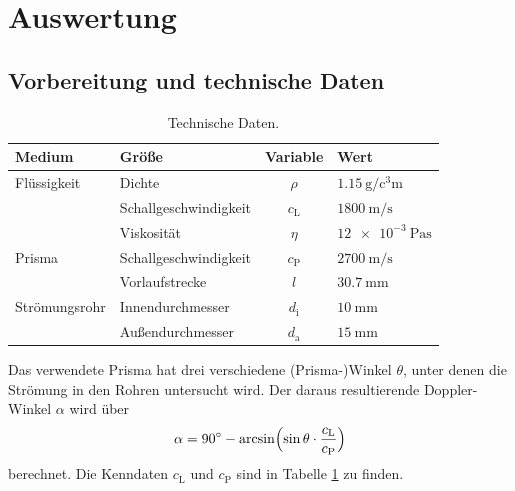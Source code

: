 \section{Auswertung}
\label{sec:Auswertung}

\subsection{Vorbereitung und technische Daten}

\begin{table}
    \centering
    \caption{Technische Daten.}
    \label{tab:techDaten}
    \begin{tabular}{l l c l}
        \toprule
        Medium          & Größe                 & Variable      & Wert                                      \\
        \midrule
        Flüssigkeit     & Dichte                & $\rho$        & $\SI{1.15}{\gram\per\cubic\centi\meter}$  \\
                        & Schallgeschwindigkeit & $c_\text{L}$  & $\SI{1800}{\meter\per\second}$            \\
                        & Viskosität            & $\eta$        & $\SI{12e-3}{\pascal\second}$              \\
        Prisma          & Schallgeschwindigkeit & $c_\text{P}$  & $\SI{2700}{\meter\per\second}$            \\
                        & Vorlaufstrecke        & $l$           & $\SI{30.7}{\milli\meter}$                 \\
        Strömungsrohr   & Innendurchmesser      & $d_\text{i}$  & $\SI{10}{\milli\meter}$                   \\
                        & Außendurchmesser      & $d_\text{a}$  & $\SI{15}{\milli\meter}$                   \\
        \bottomrule
    \end{tabular}
\end{table}

Das verwendete Prisma hat drei verschiedene (Prisma-)Winkel $\theta$, unter denen die Strömung in den Rohren untersucht wird. 
Der daraus resultierende Doppler-Winkel $\alpha$ wird über 
\begin{equation*}
    \alpha=\SI{90}{\degree}-\arcsin \Bigl(\sin \theta \cdot \frac{c_\text{L}}{c_\text{P}}\Bigr)
\end{equation*}
berechnet. Die Kenndaten $c_\text{L}$ und $c_\text{P}$ sind in Tabelle \ref{tab:techDaten} zu finden.


